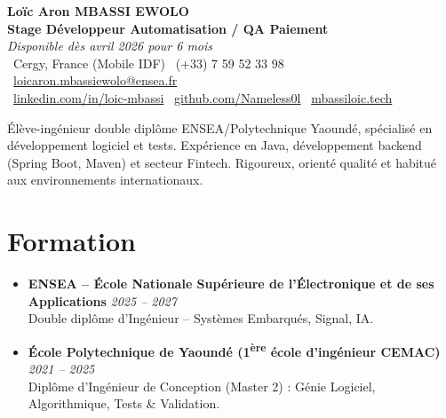 \documentclass[a4paper,11pt]{article}
\begin{document}
\begin{center}
    {\Large \textbf{Loïc Aron MBASSI EWOLO}} \\ \vspace{4pt}
    \textbf{\large Stage Développeur Automatisation / QA Paiement} \\
    \textit{\small Disponible dès avril 2026 pour 6 mois} \\ \vspace{4pt}
    \small
    \faMapMarker\ Cergy, France (Mobile IDF) \quad
    \faPhone\ (+33) 7 59 52 33 98 \quad
    \faEnvelope\ \href{mailto:loicaron.mbassiewolo@ensea.fr}{loicaron.mbassiewolo@ensea.fr} \\ \vspace{2pt}
    \faLinkedin\ \href{https://www.linkedin.com/in/loic-mbassi/}{linkedin.com/in/loic-mbassi} \quad
    \faGithub\ \href{https://github.com/Nameless0l}{github.com/Nameless0l} \quad
    \faGlobe\ \href{https://mbassiloic.tech}{mbassiloic.tech}
\end{center}

\vspace{-6pt}

\noindent\small{Élève-ingénieur double diplôme ENSEA/Polytechnique Yaoundé, spécialisé en développement logiciel et tests. Expérience en Java, développement backend (Spring Boot, Maven) et secteur Fintech. Rigoureux, orienté qualité et habitué aux environnements internationaux.}

\section{Formation}
\begin{itemize}[leftmargin=*, label=\tiny$\bullet$, nosep]
    \item \textbf{ENSEA -- École Nationale Supérieure de l'Électronique et de ses Applications} \hfill \textit{2025 -- 2027} \\
    \small{Double diplôme d'Ingénieur -- Systèmes Embarqués, Signal, IA.}
    \item \textbf{École Polytechnique de Yaoundé (1\textsuperscript{ère} école d'ingénieur CEMAC)} \hfill \textit{2021 -- 2025} \\
    \small{Diplôme d'Ingénieur de Conception (Master 2) : Génie Logiciel, Algorithmique, Tests \& Validation.}
\end{itemize}

\end{document}
